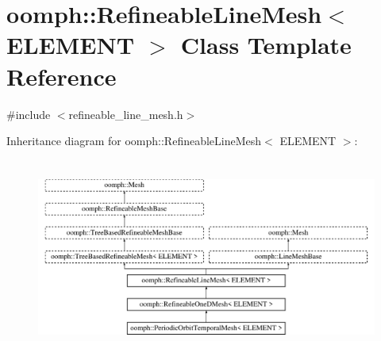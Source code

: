 \hypertarget{classoomph_1_1RefineableLineMesh}{}\section{oomph\+:\+:Refineable\+Line\+Mesh$<$ E\+L\+E\+M\+E\+NT $>$ Class Template Reference}
\label{classoomph_1_1RefineableLineMesh}


{\ttfamily \#include $<$refineable\+\_\+line\+\_\+mesh.\+h$>$}

Inheritance diagram for oomph\+:\+:Refineable\+Line\+Mesh$<$ E\+L\+E\+M\+E\+NT $>$\+:\begin{figure}[H]
\begin{center}
\leavevmode
\includegraphics[height=6.468647cm]{classoomph_1_1RefineableLineMesh}
\end{center}
\end{figure}
